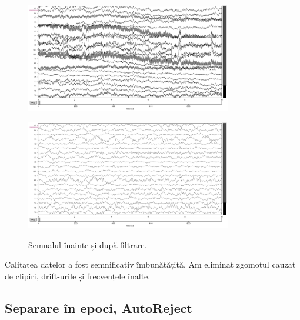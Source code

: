 \begin{figure}[!htb]
    \centering
		\vspace{-1em}
    \begin{minipage}{\textwidth}
        \centering
        \includegraphics[width=0.8\textwidth]{images/raw_inainte.png}
        \label{fig:raw_inainte}
    \end{minipage}
    \vspace{0.5cm}
    \begin{minipage}{\textwidth}
        \centering
        \includegraphics[width=0.8\textwidth]{images/raw_dupa.png}
        \label{fig:raw_dupa}
    \end{minipage}
    \caption{Semnalul înainte și după filtrare.}
		\vspace{-1em}
    \label{fig:raw_inainte_dupa}
\end{figure}

Calitatea datelor a fost semnificativ îmbunătățită. Am eliminat zgomotul cauzat de clipiri, drift-urile și frecvențele înalte.

\subsection{Separare în epoci, AutoReject}

